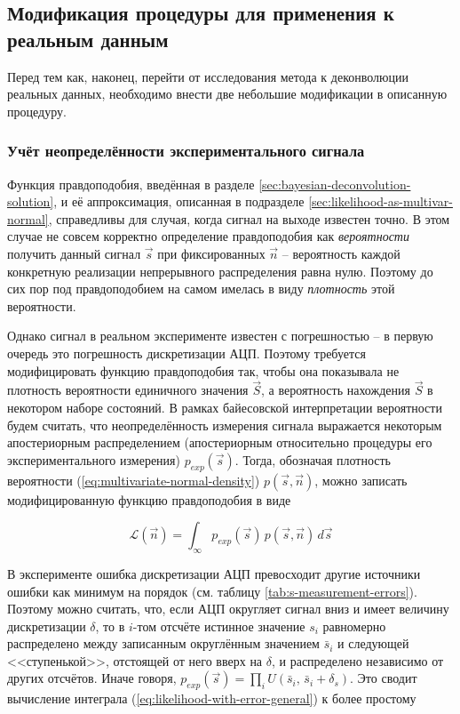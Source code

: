 \subsection{Модификация процедуры для применения к реальным данным}

Перед тем как, наконец, перейти от исследования метода к деконволюции реальных данных, необходимо внести две небольшие модификации в описанную процедуру.

\subsubsection{Учёт неопределённости экспериментального сигнала}

\label{sec:likelihood-with-error-in-signal}

Функция правдоподобия, введённая в разделе \ref{sec:bayesian-deconvolution-solution}, и её аппроксимация, описанная в подразделе \ref{sec:likelihood-as-multivar-normal}, справедливы для случая, когда сигнал на выходе известен точно. В этом случае не совсем корректно определение правдоподобия как \textit{вероятности} получить данный сигнал $\vec{s}$ при фиксированных $\vec{n}$ -- вероятность каждой конкретную реализации непрерывного распределения равна нулю. Поэтому до сих пор под правдоподобием на самом имелась в виду \textit{плотность} этой вероятности.

Однако сигнал в реальном эксперименте известен с погрешностью -- в первую очередь это погрешность дискретизации АЦП. Поэтому требуется модифицировать функцию правдоподобия так, чтобы она показывала не плотность вероятности единичного значения $\vec{S}$, а вероятность нахождения $\vec{S}$ в некотором наборе состояний. В рамках байесовской интерпретации вероятности будем считать, что неопределённость измерения сигнала выражается некоторым апостериорным распределением (апостериорным относительно процедуры его экспериментального измерения) $p_{exp}(\vec{s})$. Тогда, обозначая плотность вероятности (\ref{eq:multivariate-normal-density}) $p(\vec{s}, \vec{n})$, можно записать модифицированную функцию правдоподобия в виде

\begin{equation}
	\label{eq:likelihood-with-error-general}
	\mathcal{L}(\vec{n}) = \int_{\infty} p_{exp}(\vec{s}) \, p(\vec{s}, \vec{n}) \, d\vec{s}
\end{equation}

В эксперименте ошибка дискретизации АЦП превосходит другие источники ошибки как минимум на порядок (см. таблицу \ref{tab:s-measurement-errors}). Поэтому можно считать, что, если АЦП округляет сигнал вниз и имеет величину дискретизации $\delta$, то в $i$-том отсчёте истинное значение $s_i$ равномерно распределено между записанным округлённым значением $\bar{s}_i$ и следующей <<ступенькой>>, отстоящей от него вверх на $\delta$, и распределено независимо от других отсчётов. Иначе говоря, $p_{exp}(\vec{s}) = \prod_{i} U( \bar{s}_i, \, \bar{s}_i + \delta_s )$. Это сводит вычисление интеграла (\ref{eq:likelihood-with-error-general}) к более простому

